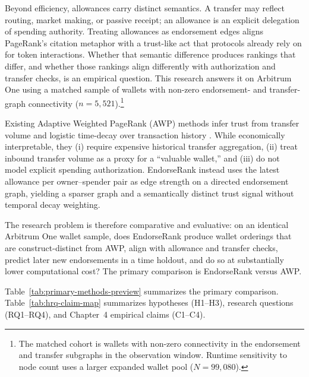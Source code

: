Beyond efficiency, allowances carry distinct semantics. A transfer may reflect routing, market making, or passive receipt; an allowance is an explicit delegation of spending authority. Treating allowances as endorsement edges aligns PageRank's citation metaphor  with a trust-like act that protocols already rely on for token interactions. Whether that semantic difference produces rankings that differ, and whether those rankings align differently with authorization and transfer checks, is an empirical question. This research answers it on Arbitrum One using a matched sample of wallets with non-zero endorsement- and transfer-graph connectivity ($n=5{,}521$).\footnote{The matched cohort is wallets with non-zero connectivity in the endorsement and transfer subgraphs in the observation window. Runtime sensitivity to node count uses a larger expanded wallet pool ($N=99{,}080$).}


Existing Adaptive Weighted PageRank (AWP) methods infer trust from transfer volume and logistic time-decay over transaction history . While economically interpretable, they (i) require expensive historical transfer aggregation, (ii) treat inbound transfer volume as a proxy for a ``valuable wallet,'' and (iii) do not model explicit spending authorization. EndorseRank instead uses the latest allowance per owner--spender pair as edge strength on a directed endorsement graph, yielding a sparser graph and a semantically distinct trust signal without temporal decay weighting.

The research problem is therefore comparative and evaluative: on an identical Arbitrum One wallet sample, does EndorseRank produce wallet orderings that are construct-distinct from AWP, align with allowance and transfer checks, predict later new endorsements in a time holdout, and do so at substantially lower computational cost? The primary comparison is EndorseRank versus AWP.

Table~\ref{tab:primary-methods-preview} summarizes the primary comparison. Table~\ref{tab:hrq-claim-map} summarizes hypotheses (H1--H3), research questions (RQ1--RQ4), and Chapter~4 empirical claims (C1--C4).

\begin{table}[htbp]
\centering
\caption{Primary comparison: EndorseRank versus AWP (matched wallet cohort, $n=5{,}521$).}
\label{tab:primary-methods-preview}
\end{table}

